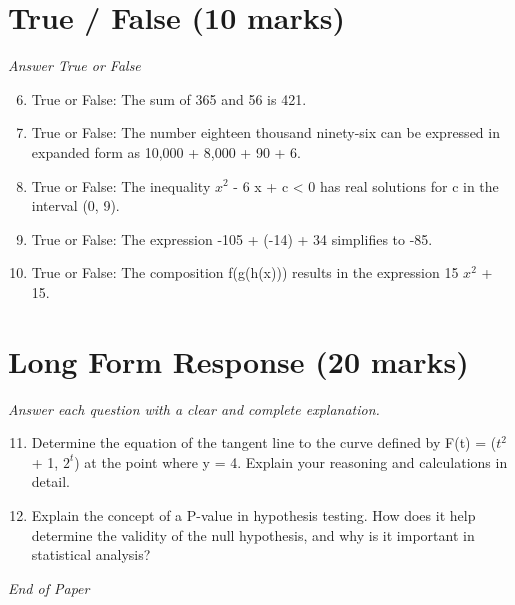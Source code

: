 \documentclass[12pt]{article}
\begin{document}
\section*{True / False (10 marks)}
\textit{Answer True or False}
\begin{enumerate}[label=\arabic*.]
\setcounter{enumi}{5}
\item True or False: The sum of 365 and 56 is 421.
\item True or False: The number eighteen thousand ninety-six can be expressed in expanded form as 10,000 + 8,000 + 90 + 6.
\item True or False: The inequality $x^2$ - 6 x + c \textless{} 0 has real solutions for c in the interval (0, 9).
\item True or False: The expression -105 + (-14) + 34 simplifies to -85.
\item True or False: The composition f(g(h(x))) results in the expression 15 $x^2$ + 15.
\end{enumerate}

\section*{Long Form Response (20 marks)}
\textit{Answer each question with a clear and complete explanation.}
\begin{enumerate}[label=\arabic*.]
\setcounter{enumi}{10}
\item Determine the equation of the tangent line to the curve defined by F(t) = ($t^2$ + 1, $2^t$) at the point where y = 4. Explain your reasoning and calculations in detail.
\item Explain the concept of a P-value in hypothesis testing. How does it help determine the validity of the null hypothesis, and why is it important in statistical analysis?
\end{enumerate}

\vfill
\noindent\textit{End of Paper}
\end{document}
